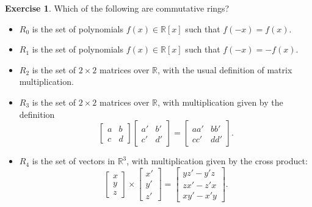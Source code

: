 \documentclass{amsart}
\newcommand{\bsm}       {\left[\begin{smallmatrix}}
\newcommand{\esm}       {\end{smallmatrix}\right]}
\newcommand{\R}         {{\mathbb{R}}}
\newcommand{\tm}        {\times}
\newcommand{\ip}[1]     {\langle #1\rangle}
\renewcommand{\:}{\colon}
\theoremstyle{definition}
\newtheorem{exercise}{Exercise}[section]
\begin{document}
\begin{exercise}
 Which of the following are commutative rings?
 \begin{itemize}
  \item $R_0$ is the set of polynomials $f(x)\in\R[x]$ such that
   $f(-x)=f(x)$. 
  \item $R_1$ is the set of polynomials $f(x)\in\R[x]$ such that
   $f(-x)=-f(x)$.
  \item $R_2$ is the set of $2\tm 2$ matrices over $\R$, with the
   usual definition of matrix multiplication.
  \item $R_3$ is the set of $2\tm 2$ matrices over $\R$, with
   multiplication given by the definition
   \[ \bsm a & b \\ c & d \esm \bsm a' & b' \\ c' & d' \esm = 
       \bsm aa' & bb' \\ cc' & dd' \esm.
   \]
  \item $R_4$ is the set of vectors in $\R^3$, with multiplication
   given by the cross product:
   \[ \bsm x \\ y \\ z \esm \tm \bsm x' \\ y' \\ z' \esm =
       \bsm y z' - y' z \\ z x' - z' x \\ x y' - x' y \esm.
   \] 
 \end{itemize}
\end{exercise}
\end{document}
